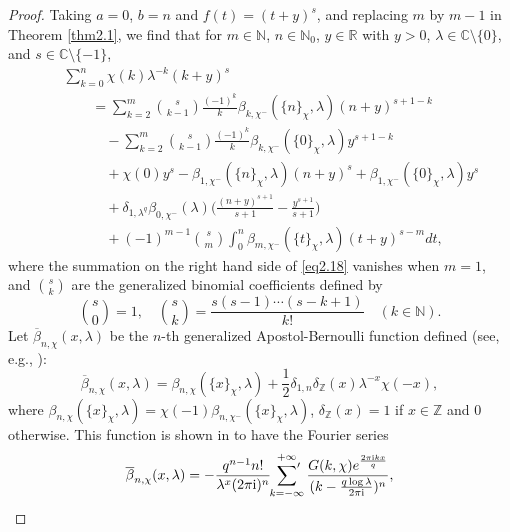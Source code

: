 \documentclass[reqno]{amsart}
\numberwithin{equation}{section}
\begin{document}
\begin{proof} Taking $a=0$, $b=n$ and $f(t)=(t+y)^{s}$, and replacing $m$ by $m-1$ in Theorem \ref{thm2.1}, we find that for $m\in\mathbb{N}$, $n\in\mathbb{N}_{0}$, $y\in\mathbb{R}$ with $y>0$, $\lambda\in\mathbb{C}\setminus\{0\}$, and $s\in\mathbb{C}\setminus\{-1\}$,
\begin{eqnarray}\label{eq2.18}
&&\sum_{k=0}^{n}\chi(k)\lambda^{-k}(k+y)^{s}\nonumber\\
&&\qquad=\sum_{k=2}^{m}\binom{s}{k-1}\frac{(-1)^{k}}{k}\beta_{k,\chi^{-}}(\{n\}_{\chi},\lambda)(n+y)^{s+1-k}\nonumber\\
&&\qquad\quad-\sum_{k=2}^{m}\binom{s}{k-1}\frac{(-1)^{k}}{k}\beta_{k,\chi^{-}}(\{0\}_{\chi},\lambda)y^{s+1-k}\nonumber\\
&&\qquad\quad+\chi(0)y^{s}-\beta_{1,\chi^{-}}(\{n\}_{\chi},\lambda)(n+y)^{s}+\beta_{1,\chi^{-}}(\{0\}_{\chi},\lambda)y^{s}\nonumber\\
&&\qquad\quad+\delta_{1,\lambda^{q}}\beta_{0,\chi^{-}}(\lambda)\biggl(\frac{(n+y)^{s+1}}{s+1}-\frac{y^{s+1}}{s+1}\biggl)\nonumber\\
&&\qquad\quad+(-1)^{m-1}\binom{s}{m}\int_{0}^{n}\beta_{m,\chi^{-}}(\{t\}_{\chi},\lambda)(t+y)^{s-m}dt,
\end{eqnarray}
where the summation on the right hand side of \eqref{eq2.18} vanishes when $m=1$, and $\binom{s}{k}$ are the generalized binomial coefficients defined by
\begin{equation*}
\binom{s}{0}=1,\quad\binom{s}{k}=\frac{s(s-1)\cdots(s-k+1)}{k!}\quad(k\in\mathbb{N}).
\end{equation*}
Let $\overline{\beta}_{n,\chi}(x,\lambda)$ be the $n$-th generalized Apostol-Bernoulli function defined (see, e.g., \cite[Definition 2.7]{he}):
\begin{equation}\label{eq2.19}
\overline{\beta}_{n,\chi}(x,\lambda)=\beta_{n,\chi}(\{x\}_{\chi},\lambda)+\frac{1}{2}\delta_{1,n}\delta_{\mathbb{Z}}(x)\lambda^{-x}\chi(-x),
\end{equation}
where $\beta_{n,\chi}(\{x\}_{\chi},\lambda)=\chi(-1)\beta_{n,\chi^{-}}(\{x\}_{\chi},\lambda)$, $\delta_{\mathbb{Z}}(x)=1$ if $x\in\mathbb{Z}$ and $0$ otherwise. This function is shown in \cite[Theorem 3.1]{he} to have the Fourier series
\begin{equation}\label{eq2.20}
\overline{\beta}_{n,\chi}(x,\lambda)=-\frac{q^{n-1}n!}{\lambda^{x}(2\pi \mathrm{i})^{n}}\sideset{}{'}\sum_{k=-\infty}^{+\infty}\frac{G(k,\chi)e^{\frac{2\pi\mathrm{i}kx}{q}}}{(k-\frac{q\log\lambda}{2\pi\mathrm{i}})^{n}},
\end{equation}

\end{proof}
\end{document}
